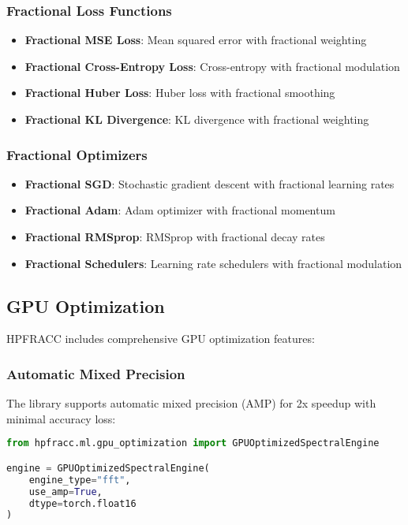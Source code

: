 \documentclass[12pt]{article}
\begin{document}
\subsubsection{Fractional Loss Functions}

\begin{itemize}
\item \textbf{Fractional MSE Loss}: Mean squared error with fractional weighting
\item \textbf{Fractional Cross-Entropy Loss}: Cross-entropy with fractional modulation
\item \textbf{Fractional Huber Loss}: Huber loss with fractional smoothing
\item \textbf{Fractional KL Divergence}: KL divergence with fractional weighting
\end{itemize}

\subsubsection{Fractional Optimizers}

\begin{itemize}
\item \textbf{Fractional SGD}: Stochastic gradient descent with fractional learning rates
\item \textbf{Fractional Adam}: Adam optimizer with fractional momentum
\item \textbf{Fractional RMSprop}: RMSprop with fractional decay rates
\item \textbf{Fractional Schedulers}: Learning rate schedulers with fractional modulation
\end{itemize}

\subsection{GPU Optimization}

HPFRACC includes comprehensive GPU optimization features:

\subsubsection{Automatic Mixed Precision}

The library supports automatic mixed precision (AMP) for 2x speedup with minimal accuracy loss:

\begin{lstlisting}[language=Python]
from hpfracc.ml.gpu_optimization import GPUOptimizedSpectralEngine

engine = GPUOptimizedSpectralEngine(
    engine_type="fft",
    use_amp=True,
    dtype=torch.float16
)
\end{lstlisting}
\end{document}
